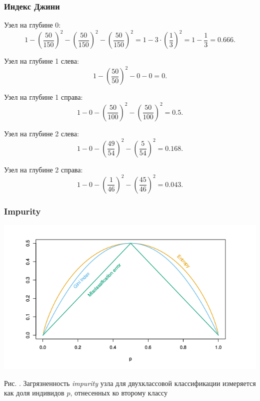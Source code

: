 \documentclass[pdf, 9pt, usenames, dvipsnames, unicode, hyperref={bookmarks=true,bookmarksopen=false, bookmarksnumbered}]{beamer}
\begin{document}
\begin{frame}\frametitle{Индекс Джини}

Узел на глубине 0:
$$1 - \left(\dfrac{50}{150} \right)^2 - \left(\dfrac{50}{150} \right)^2 - \left(\dfrac{50}{150} \right)^2 = 1 - 3 \cdot \left(\dfrac{1}{3} \right)^2 = 1 - \dfrac{1}{3} = 0.666. $$ 

Узел на глубине 1 слева:
$$1 - \left( \dfrac{50}{50} \right)^2 - 0 - 0 = 0.$$

Узел на глубине 1 справа:
$$1 - 0 - \left( \dfrac{50}{100} \right)^2 - \left( \dfrac{50}{100} \right)^2 = 0.5. $$

Узел на глубине 2 слева:
$$1 - 0 - \left( \dfrac{49}{54} \right)^2 - \left( \dfrac{5}{54} \right)^2 = 0.168.$$

Узел на глубине 2 справа:
$$1 - 0 - \left( \dfrac{1}{46} \right)^2 - \left( \dfrac{45}{46} \right)^2 = 0.043.$$

\end{frame}


\begin{frame}\frametitle{Impurity}

\begin{center}
	\includegraphics[scale=0.7]{pic5}
\end{center}
\begin{center}
	Рис. . Загрязненность \textit{impurity} узла для двухклассовой классификации измеряется как доля индивидов $p$, отнесенных ко второму классу
\end{center}

\end{frame}

\end{document}
